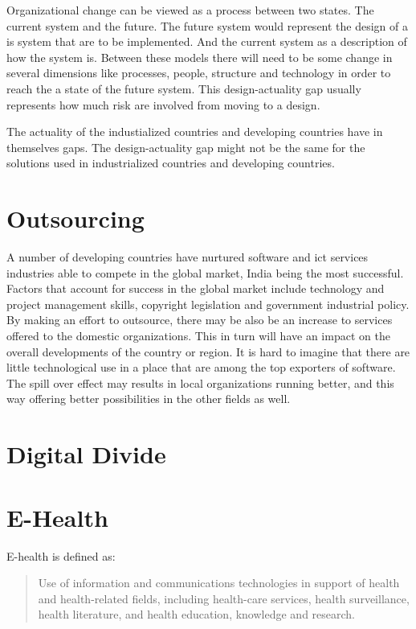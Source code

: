 Organizational change can be viewed as a process between two states.
The current system and the future.
The future system would represent the design of a \gls{is} system that are to be implemented.
And the current system as a description of how the system is.
Between these models there will need to be some change in several dimensions like processes, people, structure and technology in order to reach the a state of the future system. This design-actuality gap usually represents how much risk are involved from moving to a design. 

The actuality of the industialized countries and developing countries have in themselves gaps.
The design-actuality gap might not be the same for the solutions used in industrialized countries and developing countries. 

\cite{rh:isdc}
\cite{ca:isdc}


\section{Outsourcing}
A number of developing countries have nurtured software and \gls{ict} services industries able to compete in the global market, India being the most successful. 
Factors that account for success in the global market include technology and project management skills, copyright legislation and government industrial policy. By making an effort to outsource, there may be also be an increase to services offered to the domestic organizations. This in turn will have an impact on the overall developments of the country or region. It is hard to imagine that there are little technological use in a place that are among the top exporters of software. The spill over effect may results in local organizations running better, and this way offering better possibilities in the other fields as well.

\cite{ca:isdc}






\section{Digital Divide}

\section{E-Health}
E-health is defined as:
\begin{quotation}
Use of information and communications technologies in support of health and health-related fields, including health-care services, health surveillance, health literature, and health education, knowledge and research.
\end{quotation}

